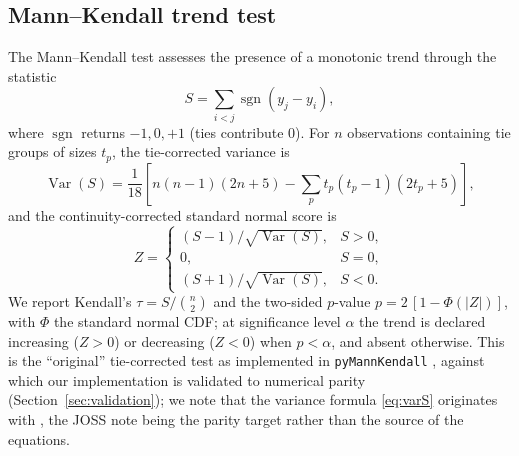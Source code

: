 \documentclass[review]{elsarticle}
\begin{document}
\subsection{Mann--Kendall trend test}
\label{sec:mk}
The Mann--Kendall test \citep{mann1945,kendall1975} assesses the presence of a
monotonic trend through the statistic
\begin{equation}
S = \sum_{i<j} \operatorname{sgn}(y_j - y_i),
\end{equation}
where $\operatorname{sgn}$ returns $-1,0,+1$ (ties contribute $0$). For $n$
observations containing tie groups of sizes $t_p$, the tie-corrected variance is
\begin{equation}
\label{eq:varS}
\operatorname{Var}(S) = \frac{1}{18}\!\left[ n(n-1)(2n+5)
  - \sum_{p} t_p (t_p - 1)(2 t_p + 5) \right],
\end{equation}
and the continuity-corrected standard normal score is
\begin{equation}
Z =
\begin{cases}
(S-1)/\sqrt{\operatorname{Var}(S)}, & S > 0,\\[2pt]
0, & S = 0,\\[2pt]
(S+1)/\sqrt{\operatorname{Var}(S)}, & S < 0.
\end{cases}
\end{equation}
We report Kendall's $\tau = S/\binom{n}{2}$ and the two-sided $p$-value
$p = 2\,[1-\Phi(|Z|)]$, with $\Phi$ the standard normal CDF; at significance
level $\alpha$ the trend is declared increasing ($Z>0$) or decreasing ($Z<0$)
when $p<\alpha$, and absent otherwise. This is the ``original'' tie-corrected
test as implemented in \texttt{pyMannKendall} \citep{hussain2019pymannkendall},
against which our implementation is validated to numerical parity
(Section~\ref{sec:validation}); we note that the variance formula
\eqref{eq:varS} originates with \citet{mann1945,kendall1975}, the JOSS note being
the parity target rather than the source of the equations.
\end{document}
